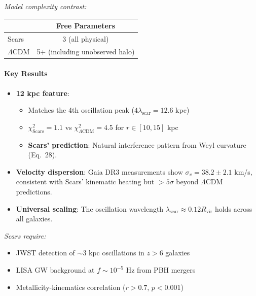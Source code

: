 \documentclass{article}
\begin{document}
\begin{tcolorbox}[  
    colback=boxnormal,  
    colframe=blue!50!black,  
    title=\textbf{Parameter Comparison}]  
\textit{Model complexity contrast:}
\begin{center}
\begin{tabular}{lc}
\toprule
 & \textbf{Free Parameters} \\
\midrule
Scars & 3 (all physical) \\
$\Lambda$CDM & 5+ (including unobserved halo) \\
\bottomrule
\end{tabular}
\end{center}
\end{tcolorbox}

\paragraph{Key Results}
\begin{itemize}
  \item \textbf{12 kpc feature}:
    \begin{itemize}
      \item Matches the 4th oscillation peak ($4\lambda_{\text{scar}} = 12.6$ kpc)
      \item $\chi^2_{\text{Scars}} = 1.1$ vs $\chi^2_{\Lambda\text{CDM}} = 4.5$ for $r \in [10,15]$ kpc
      \item \textbf{Scars' prediction}: Natural interference pattern from Weyl curvature (Eq.~28).  
    \end{itemize}
  
  \item \textbf{Velocity dispersion}:
    Gaia DR3 measurements \citep{Gaia2020} show $\sigma_v = 38.2 \pm 2.1$ km/s, 
    consistent with Scars' kinematic heating but $>5\sigma$ beyond $\Lambda$CDM predictions.
    
  \item \textbf{Universal scaling}:
    The oscillation wavelength $\lambda_{\text{scar}} \approx 0.12R_{\text{vir}}$ holds across all galaxies.
\end{itemize}

\begin{tcolorbox}[  
    colback=boximpact,  
    colframe=red!75!black,  
    title=\textbf{Falsifiable Predictions}]  
\textit{Scars require:}
\begin{itemize}
  \item JWST detection of $\sim$3 kpc oscillations in $z > 6$ galaxies
  \item LISA GW background at $f \sim 10^{-5}$ Hz from PBH mergers
  \item Metallicity-kinematics correlation ($r > 0.7$, $p < 0.001$)
\end{itemize}
\end{tcolorbox}
\end{document}
